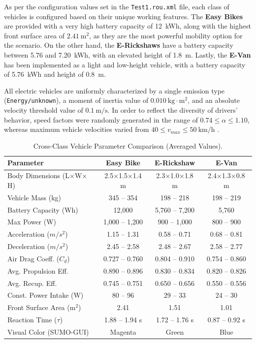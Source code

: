 \documentclass{thesis-library}
\begin{document}
As per the configuration values set in the \texttt{Test1.rou.xml} file, each class of vehicles is configured based on their unique working features. The \textbf{Easy Bikes} are provided with a very high battery capacity of 12~kWh, along with the highest front surface area of $2.41~\text{m}^2$, as they are the most powerful mobility option for the scenario. On the other hand, the \textbf{E-Rickshaws} have a battery capacity between 5.76 and 7.20~kWh, with an elevated height of 1.8~m. Lastly, the \textbf{E-Van} has been implemented as a light and low-height vehicle, with a battery capacity of 5.76~kWh and height of 0.8~m.

All electric vehicles are uniformly characterized by a single emission type (\texttt{Energy/unknown}), a moment of inertia value of $0.010~\text{kg}\cdot\text{m}^2$, and an absolute velocity threshold value of $0.1~\text{m/s}$. In order to reflect the diversity of drivers' behavior, speed factors were randomly generated in the range of $0.74 \leq \alpha \leq 1.10$, whereas maximum vehicle velocities varied from $40 \leq v_{max} \leq 50~\text{km/h}$ \cite{parking_area_ev2022}.

\begin{table}[H]
\caption{Cross-Class Vehicle Parameter Comparison (Averaged Values).}
\label{tab:class_comparison}
\begin{center}
\begin{small}
\begin{tabular}{lccc}
\toprule
\textbf{Parameter} & \textbf{Easy Bike} & \textbf{E-Rickshaw} & \textbf{E-Van} \\
\midrule
Body Dimensions (L$\times$W$\times$H) & 2.5$\times$1.5$\times$1.4 m & 2.3$\times$1.0$\times$1.8 m & 2.4$\times$1.3$\times$0.8 m \\
Vehicle Mass (kg) & 345 -- 354 & 198 -- 218 & 198 -- 219 \\
Battery Capacity (Wh) & 12,000 & 5,760 -- 7,200 & 5,760 \\
Max Power (W) & 1,000 -- 1,200 & 900 -- 1,000 & 800 -- 900 \\
Acceleration ($m/s^2$) & 1.15 -- 1.31 & 0.58 -- 0.71 & 0.68 -- 0.81 \\
Deceleration ($m/s^2$) & 2.45 -- 2.58 & 2.48 -- 2.67 & 2.58 -- 2.77 \\
Air Drag Coeff. ($C_d$) & 0.727 -- 0.760 & 0.804 -- 0.910 & 0.754 -- 0.860 \\
Avg. Propulsion Eff. & 0.890 -- 0.896 & 0.830 -- 0.834 & 0.820 -- 0.826 \\
Avg. Recup. Eff. & 0.745 -- 0.751 & 0.650 -- 0.656 & 0.550 -- 0.556 \\
Const. Power Intake (W) & 80 -- 96 & 29 -- 33 & 24 -- 30 \\
Front Surface Area ($\text{m}^2$) & 2.41 & 1.51 & 1.01 \\
Reaction Time ($\tau$) & 1.88 -- 1.94 s & 1.72 -- 1.76 s & 0.87 -- 0.92 s \\
Visual Color (SUMO-GUI) & Magenta & Green & Blue \\
\bottomrule
\end{tabular}
\end{small}
\end{center}
\end{table}
\end{document}
